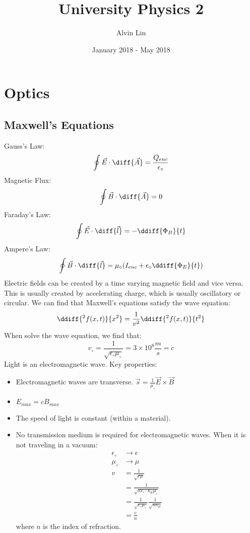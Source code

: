 \documentclass{math}
\title{University Physics 2}
\author{Alvin Lin}
\date{January 2018 - May 2018}
\begin{document}
\maketitle

\section*{Optics}

\subsection*{Maxwell's Equations}
Gauss's Law:
\[ \oint\vec{E}\cdot\diff{\vec{A}} = \frac{Q_{enc}}{\epsilon_{\circ}} \]
Magnetic Flux:
\[ \oint\vec{B}\cdot\diff{\vec{A}} = 0 \]
Faraday's Law:
\[ \oint\vec{E}\cdot\diff{\vec{l}} = -\ddiff{\Phi_B}{t} \]
Ampere's Law:
\[ \oint\vec{B}\cdot\diff{\vec{l}} =
  \mu_{\circ}(I_{enc}+\epsilon_{\circ}\ddiff{\Phi_E}{t}) \]
Electric fields can be created by a time varying magnetic field and vice versa.
This is usually created by accelerating charge, which is usually oscillatory or
circular. We can find that Maxwell's equations satisfy the wave equation:
\[ \ddiff{^2f(x,t)}{x^2} = \frac{1}{v^2}\ddiff{^2f(x,t)}{t^2} \]
When solve the wave equation, we find that:
\[ v_{\circ} = \frac{1}{\sqrt{\epsilon_{\circ}\mu_{\circ}}} =
  3\times10^8\frac{m}{s} = c \]
Light is an electromagnetic wave. Key properties:
\begin{itemize}
  \item Electromagnetic waves are transverse.
  \( \vec{s} = \frac{1}{\mu_{\circ}}\vec{E}\times\vec{B} \)
  \item \( E_{max} = cB_{max} \)
  \item The speed of light is constant (within a material).
  \item No transmission medium is required for electromagnetic waves. When it
  is not traveling in a vacuum:
  \begin{align*}
    \epsilon_{\circ} &\to \epsilon \\
    \mu_{\circ} &\to \mu \\
    v &= \frac{1}{\sqrt{\epsilon\mu}} \\
    &= \frac{1}{\sqrt{\kappa\epsilon_{\circ}\cdot\kappa_{\mu}\mu_{\circ}}} \\
    &= \frac{1}{\sqrt{\epsilon_{\circ}\mu_{\circ}}}
      \frac{1}{\sqrt{\kappa\kappa_{\mu}}} \\
    &= \frac{c}{n}
  \end{align*}
  where \( n \) is the index of refraction.
\end{itemize}
\end{document}
